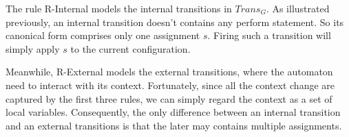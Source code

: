 The rule R-Internal models the internal transitions in $Trans_G$. As illustrated previously, an internal transition doesn't contains any perform statement. So its canonical form comprises only one assignment $s$. Firing such a transition will simply apply $s$ to the current configuration.

Meanwhile, R-External models the external transitions, where the automaton need to interact with its context. Fortunately, since all the context change are captured by the first three rules, we can simply regard the context as a set of local variables. Consequently, the only difference between an internal transition and an external transitions is that the later may contains multiple assignments.

